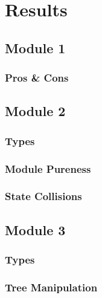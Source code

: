 \chapter{Results}

\section{Module 1}

\subsection{Pros \& Cons}

\section{Module 2}

\subsection{Types}

\subsection{Module Pureness}

\subsection{State Collisions}

\section{Module 3}

\subsection{Types}

\subsection{Tree Manipulation}
